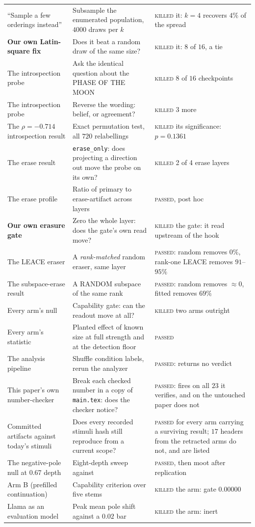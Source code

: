 \documentclass{article}
\begin{document}
{\begin{longtable}{@{}L{0.24\textwidth} L{0.44\textwidth} L{0.24\textwidth}@{}}
``Sample a few orderings instead'' & Subsample the enumerated population, $4000$ draws per $k$ & \textsc{killed} it: $k{=}4$ recovers $4\%$ of the spread \\
\textbf{Our own Latin-square fix} & Does it beat a random draw of the same size? & \textsc{killed} it: $8$ of $16$, a tie \\
The introspection probe & Ask the identical question about the PHASE OF THE MOON & \textsc{killed} $8$ of $16$ checkpoints \\
The introspection probe & Reverse the wording: belief, or agreement? & \textsc{killed} $3$ more \\
The $\rho=-0.714$ introspection result & Exact permutation test, all $720$ relabellings & \textsc{killed} its significance: $p=0.1361$ \\
The erase result & \texttt{erase\_only}: does projecting a direction out move the probe on its own? & \textsc{killed} 2 of 4 erase layers \\
The erase profile & Ratio of primary to erase-artifact across layers & \textsc{passed}, post hoc \\
\textbf{Our own erasure gate} & Zero the whole layer: does the gate's own read move? & \textsc{killed} the gate: it read upstream of the hook \\
The LEACE eraser & A \emph{rank-matched} random eraser, same layer & \textsc{passed}: random removes $0\%$, rank-one LEACE removes $91$--$95\%$ \\
The subspace-erase result & A RANDOM subspace of the same rank & \textsc{passed}: random removes $\approx 0$, fitted removes $69\%$ \\
Every arm's null & Capability gate: can the readout move at all? & \textsc{killed} two arms outright \\
Every arm's statistic & Planted effect of known size at full strength and at the detection floor & \textsc{passed} \\
The analysis pipeline & Shuffle condition labels, rerun the analyzer & \textsc{passed}: returns no verdict \\
This paper's own number-checker & Break each checked number in a copy of \texttt{main.tex}: does the checker notice? & \textsc{passed}: fires on all $23$ it verifies, and on the untouched paper does not \\
Committed artifacts against today's stimuli & Does every recorded stimuli hash still reproduce from a current scope? & \textsc{passed} for every arm carrying a surviving result; $17$ headers from the retracted arms do not, and are listed \\
The negative-pole null at 0.67 depth & Eight-depth sweep against \citet{venkatesh2026} & \textsc{passed}, then moot after replication \\
Arm B (prefilled continuation) & Capability criterion over five stems & \textsc{killed} the arm: gate $0.00000$ \\
Llama as an evaluation model & Peak mean pole shift against a $0.02$ bar & \textsc{killed} the arm: inert \\
\end{longtable}
}
\end{document}
